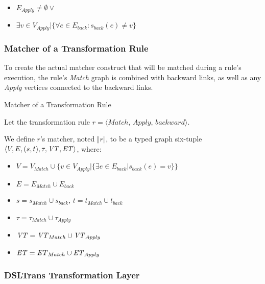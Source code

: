 \begin{itemize}
\item $E_{\textit{Apply}} \neq \emptyset \lor$
\item $ \exists v \in V_{\textit{Apply}} | \big\{\forall e \in E_{back}: s_{back}(e) \neq v \big\}$
\end{itemize}


\subsubsection*{Matcher of a Transformation Rule}

To create the actual matcher construct that will be matched during a rule's execution, the rule's \textit{Match} graph is combined with backward links, as well as any \textit{Apply} vertices connected to the backward links.


\begin{definition}{Matcher of a Transformation Rule\\}
\label{def:back_match_transformation_rule}

Let the transformation rule $r = \big\langle \mathit{Match}$, $\mathit{Apply}$, $\mathit{backward}\big\rangle$.

We define $r$'s matcher, noted $\Vert r \Vert$, to be a typed graph six-tuple $\langle V,E,(s,t),\tau, \mathit{VT}, \mathit{ET}\rangle$, where:
\begin{itemize}
\item $V = V_{Match} \cup \big\{v \in V_{Apply} | \{\exists e \in E_{back} | s_{back}(e) = v\}\big\}$
\item $E = E_{Match} \cup E_{back}$
\item $s = s_{Match} \cup s_{back}$, $t = t_{Match} \cup t_{back}$
\item $\tau = \tau_{Match} \cup \tau_{Apply}$
\item $\mathit{VT} = \mathit{VT}_{Match} \cup \mathit{VT}_{Apply}$
\item $\mathit{ET} = \mathit{ET}_{Match} \cup \mathit{ET}_{Apply}$
\end{itemize}

\end{definition}

\subsubsection*{DSLTrans Transformation Layer}

